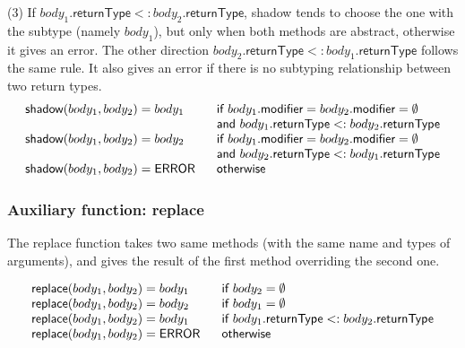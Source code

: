 (3) If $body_1.\textsf{returnType}<:body_2.\textsf{returnType}$, \textsf{shadow} tends to choose the one with the subtype (namely $body_1$), but only when both methods are abstract, otherwise it gives an error. The other direction $body_2.\textsf{returnType}<:body_1.\textsf{returnType}$ follows the same rule. It also gives an error if there is no subtyping relationship between two return types.
\begin{equation*}
\begin{array}{ll}
\textsf{shadow}(body_1, body_2)=body_1 & \textsf{if }body_1.\textsf{modifier}=body_2.\textsf{modifier}=\emptyset\\
& \textsf{and }body_1.\textsf{returnType}<:body_2.\textsf{returnType}\\
\textsf{shadow}(body_1, body_2)=body_2 & \textsf{if }body_1.\textsf{modifier}=body_2.\textsf{modifier}=\emptyset\\
& \textsf{and }body_2.\textsf{returnType}<:body_1.\textsf{returnType}\\
\textsf{shadow}(body_1, body_2)=\textsf{ERROR} \hspace{.1in} & \textsf{otherwise}
\end{array}
\end{equation*}

\subsubsection{Auxiliary function: \textsf{replace}}

The \textsf{replace} function takes two same methods (with the same name and types of arguments), and gives the result of the first method overriding the second one.

\begin{equation*}
\begin{array}{ll}
\textsf{replace}(body_1, body_2)=body_1 & \textsf{if }body_2=\emptyset\\
\textsf{replace}(body_1, body_2)=body_2 & \textsf{if }body_1=\emptyset\\
\textsf{replace}(body_1, body_2)=body_1 & \textsf{if }body_1.\textsf{returnType}<:body_2.\textsf{returnType}\\
\textsf{replace}(body_1, body_2)=\textsf{ERROR} \hspace{.1in} & \textsf{otherwise}
\end{array}
\end{equation*}


